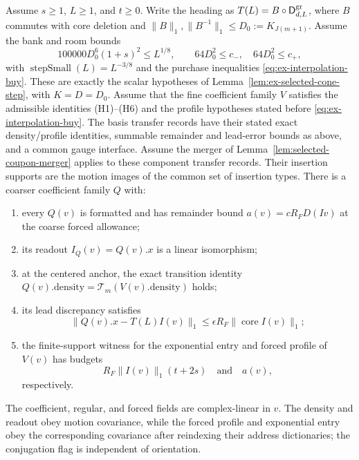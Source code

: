 \begin{proposition}
\label{prop:ex-selected-interpolation}
Assume $s\ge1$, $L\ge1$, and $t\ge0$. Write the heading as
$T(L)=B\circ\mathsf D^{\rm gr}_{d,L}$, where $B$ commutes with core deletion
and $\|B\|_{1},\|B^{-1}\|_{1}\le D_0:=K_{J(m+1)}$. Assume the bank and
room bounds
\[
100000D_0^6(1+s)^2\le L^{1/8},\qquad
64D_0^2\le c_-,\quad 64D_0^2\le c_+,
\]
with $\operatorname{stepSmall}(L)=L^{-3/8}$ and the purchase inequalities
\eqref{eq:ex-interpolation-buy}. These are exactly the scalar hypotheses of
Lemma~\ref{lem:ex-selected-cone-step}, with $K=D=D_0$.
Assume that the fine coefficient family $V$ satisfies the admissible identities (H1)--(H6)
and the profile hypotheses stated before \eqref{eq:ex-interpolation-buy}.
The basis
transfer records have their stated exact density/profile identities, summable
remainder and lead-error bounds as above, and a common gauge interface. Assume
the merger of Lemma~\ref{lem:selected-coupon-merger} applies to these component transfer records. Their insertion supports
are the motion images of the common set of insertion types.
There is a coarser
coefficient family $Q$ with:
\begin{enumerate}
\item every $Q(v)$ is formatted and has remainder bound
      $a(v)=cR_FD(Iv)$ at the coarse forced allowance;
\item its readout $I_Q(v)=Q(v).x$ is a linear isomorphism;
\item at the centered anchor, the exact transition identity
      $Q(v).\mathrm{density}=\mathcal T_m(V(v).\mathrm{density})$ holds;
\item its lead discrepancy satisfies
\[
 \|Q(v).x-T(L)I(v)\|_1
       \le\epsilon R_F\|\operatorname{core}I(v)\|_1;
 \]
\item the finite-support witness for the exponential entry and forced profile
      of $V(v)$ has budgets
\[
 R_F\|I(v)\|_1(t+2s)\quad\text{and}\quad a(v),
\]
      respectively.
\end{enumerate}
The coefficient, regular, and forced fields are complex-linear in $v$.
The density and readout obey motion covariance, while the forced profile and
exponential entry obey the corresponding covariance after reindexing their
address dictionaries; the conjugation flag is independent of orientation.
\end{proposition}

